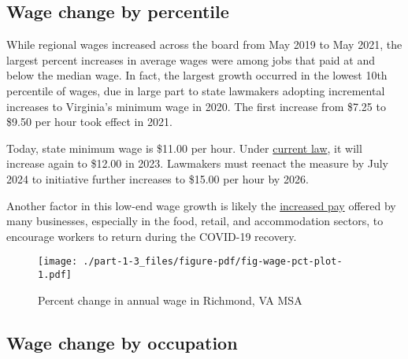 \documentclass[
  letterpaper,
  DIV=11,
  numbers=noendperiod]{scrreprt}
\begin{document}
\hypertarget{wage-change-by-percentile}{%
\subsection{Wage change by percentile}\label{wage-change-by-percentile}}

While regional wages increased across the board from May 2019 to May
2021, the largest percent increases in average wages were among jobs
that paid at and below the median wage. In fact, the largest growth
occurred in the lowest 10th percentile of wages, due in large part to
state lawmakers adopting incremental increases to Virginia's minimum
wage in 2020. The first increase from \$7.25 to \$9.50 per hour took
effect in 2021.

\begin{tcolorbox}[enhanced jigsaw, colback=white, colbacktitle=quarto-callout-note-color!10!white, bottomrule=.15mm, opacitybacktitle=0.6, colframe=quarto-callout-note-color-frame, breakable, opacityback=0, bottomtitle=1mm, titlerule=0mm, coltitle=black, leftrule=.75mm, left=2mm, title=\textcolor{quarto-callout-note-color}{\faInfo}\hspace{0.5em}{Note}, toptitle=1mm, arc=.35mm, rightrule=.15mm, toprule=.15mm]
Today, state minimum wage is \$11.00 per hour. Under
\href{https://lis.virginia.gov/cgi-bin/legp604.exe?201+sum+SB7}{current
law}, it will increase again to \$12.00 in 2023. Lawmakers must reenact
the measure by July 2024 to initiative further increases to \$15.00 per
hour by 2026.
\end{tcolorbox}

Another factor in this low-end wage growth is likely the
\href{https://www.bls.gov/opub/ted/2022/24-percent-of-establishments-increased-pay-or-paid-bonuses-because-of-covid-19-pandemic.htm}{increased
pay} offered by many businesses, especially in the food, retail, and
accommodation sectors, to encourage workers to return during the
COVID-19 recovery.

\begin{figure}

{\centering \texttt{[image: ./part-1-3\_files/figure-pdf/fig-wage-pct-plot-1.pdf]}

}

\caption{\label{fig-wage-pct-plot}Percent change in annual wage in
Richmond, VA MSA}

\end{figure}

\hypertarget{wage-change-by-occupation}{%
\subsection{Wage change by occupation}\label{wage-change-by-occupation}}
\end{document}
